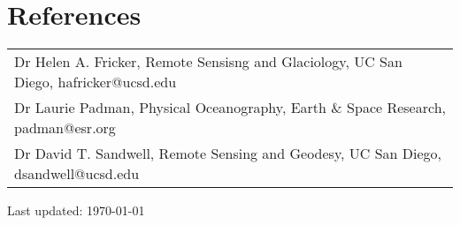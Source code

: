 \documentclass[a4paper,11pt]{article}
\begin{document}

%


\section{References}

\begin{small}
\begin{tabular}{p{}}
Dr Helen A. Fricker, Remote Sensisng and Glaciology, UC San Diego, hafricker@ucsd.edu\\
Dr Laurie Padman, Physical Oceanography, Earth \& Space Research, padman@esr.org\\
Dr David T. Sandwell, Remote Sensing and Geodesy, UC San Diego, dsandwell@ucsd.edu
\end{tabular}
\end{small}


\bigskip
\begin{center}
  \begin{footnotesize}
  \textcolor[gray]{0.45}{Last updated: \today}\\
  \end{footnotesize}
\end{center}

\newpage

\end{document}
